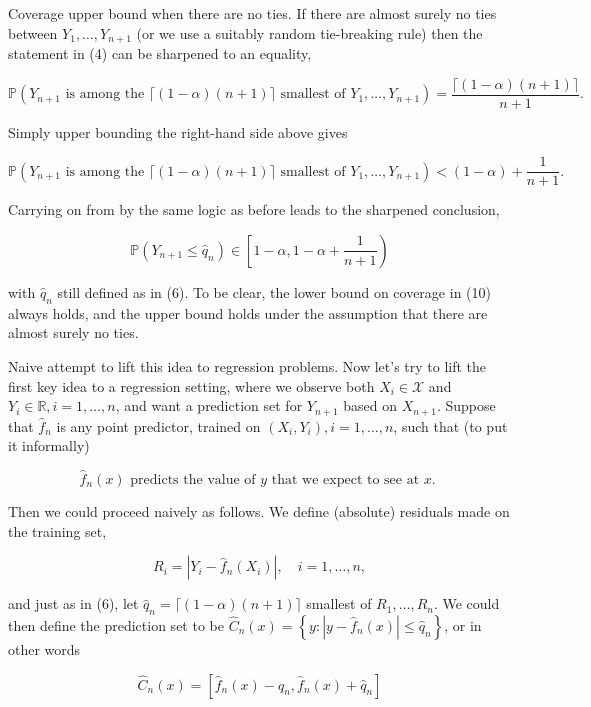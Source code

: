\documentclass[10pt]{article}
\begin{document}
Coverage upper bound when there are no ties. If there are almost surely no ties between $Y_{1}, \ldots, Y_{n+1}$ (or we use a suitably random tie-breaking rule) then the statement in (4) can be sharpened to an equality,

$$
\mathbb{P}\left(Y_{n+1} \text { is among the }\lceil(1-\alpha)(n+1)\rceil \text { smallest of } Y_{1}, \ldots, Y_{n+1}\right)=\frac{\lceil(1-\alpha)(n+1)\rceil}{n+1} .
$$

Simply upper bounding the right-hand side above gives

$$
\mathbb{P}\left(Y_{n+1} \text { is among the }\lceil(1-\alpha)(n+1)\rceil \text { smallest of } Y_{1}, \ldots, Y_{n+1}\right)<(1-\alpha)+\frac{1}{n+1} .
$$

Carrying on from by the same logic as before leads to the sharpened conclusion,

$$
\mathbb{P}\left(Y_{n+1} \leq \hat{q}_{n}\right) \in\left[1-\alpha, 1-\alpha+\frac{1}{n+1}\right)
$$

with $\hat{q}_{n}$ still defined as in (6). To be clear, the lower bound on coverage in (10) always holds, and the upper bound holds under the assumption that there are almost surely no ties.

Naive attempt to lift this idea to regression problems. Now let's try to lift the first key idea to a regression setting, where we observe both $X_{i} \in \mathcal{X}$ and $Y_{i} \in \mathbb{R}, i=1, \ldots, n$, and want a prediction set for $Y_{n+1}$ based on $X_{n+1}$. Suppose that $\hat{f}_{n}$ is any point predictor, trained on $\left(X_{i}, Y_{i}\right), i=1, \ldots, n$, such that (to put it informally)

$$
\hat{f}_{n}(x) \text { predicts the value of } y \text { that we expect to see at } x \text {. }
$$

Then we could proceed naively as follows. We define (absolute) residuals made on the training set,

$$
R_{i}=\left|Y_{i}-\hat{f}_{n}\left(X_{i}\right)\right|, \quad i=1, \ldots, n,
$$

and just as in (6), let $\hat{q}_{n}=\lceil(1-\alpha)(n+1)\rceil$ smallest of $R_{1}, \ldots, R_{n}$. We could then define the prediction set to be $\hat{C}_{n}(x)=\left\{y:\left|y-\hat{f}_{n}(x)\right| \leq \hat{q}_{n}\right\}$, or in other words

$$
\hat{C}_{n}(x)=\left[\hat{f}_{n}(x)-\hat{q}_{n}, \hat{f}_{n}(x)+\hat{q}_{n}\right]
$$
\end{document}

